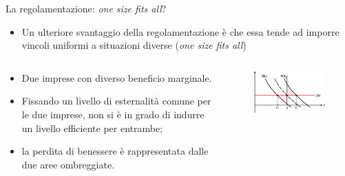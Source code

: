 \documentclass[aspectratio=64,12pt]{beamer}
\begin{document}
\begin{frame}{La regolamentazione: \emph{one size fits all}?}
\begin{itemize}
\item Un ulteriore svantaggio della regolamentazione è che essa tende ad
imporre vincoli uniformi a situazioni diverse (\emph{one size fits all})
\end{itemize}

\begin{columns}
\begin{column}{.5\columnwidth}
\begin{itemize}
\item Due imprese con diverso beneficio marginale.
\item Fissando un livello di esternalità comune per le due imprese, non si è
in grado di indurre un livello efficiente per entrambe;
\item la perdita di benessere è rappresentata dalle due aree ombreggiate.
\end{itemize}
\end{column}

\begin{column}{.5\columnwidth}
\begin{figure}[htbp] \centering
\includegraphics[width=\textwidth]{./figure/esternalita-8-color.pdf}
\end{figure}
\end{column}
\end{columns}
\end{frame}
\end{document}
